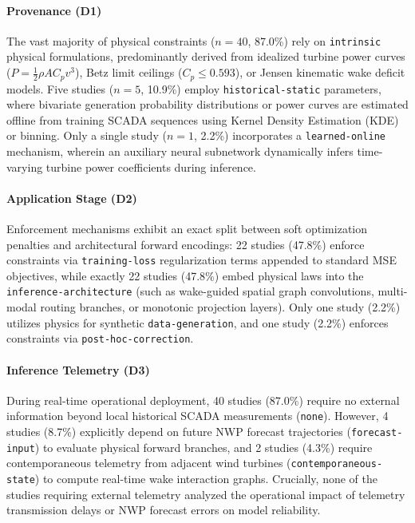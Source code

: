 \documentclass[preprint,3p,times]{elsarticle}
\begin{document}
\paragraph{Provenance (D1)} The vast majority of physical constraints ($n=40$, 87.0\%) rely on \texttt{intrinsic} physical formulations, predominantly derived from idealized turbine power curves ($P = \frac{1}{2} \rho A C_p v^3$), Betz limit ceilings ($C_p \le 0.593$), or Jensen kinematic wake deficit models. Five studies ($n=5$, 10.9\%) employ \texttt{historical-static} parameters, where bivariate generation probability distributions or power curves are estimated offline from training SCADA sequences using Kernel Density Estimation (KDE) or binning. Only a single study ($n=1$, 2.2\%) incorporates a \texttt{learned-online} mechanism, wherein an auxiliary neural subnetwork dynamically infers time-varying turbine power coefficients during inference.

\paragraph{Application Stage (D2)} Enforcement mechanisms exhibit an exact split between soft optimization penalties and architectural forward encodings: 22 studies (47.8\%) enforce constraints via \texttt{training-loss} regularization terms appended to standard MSE objectives, while exactly 22 studies (47.8\%) embed physical laws into the \texttt{inference-architecture} (such as wake-guided spatial graph convolutions, multi-modal routing branches, or monotonic projection layers). Only one study (2.2\%) utilizes physics for synthetic \texttt{data-generation}, and one study (2.2\%) enforces constraints via \texttt{post-hoc-correction}.

\paragraph{Inference Telemetry (D3)} During real-time operational deployment, 40 studies (87.0\%) require no external information beyond local historical SCADA measurements (\texttt{none}). However, 4 studies (8.7\%) explicitly depend on future NWP forecast trajectories (\texttt{forecast-input}) to evaluate physical forward branches, and 2 studies (4.3\%) require contemporaneous telemetry from adjacent wind turbines (\texttt{contemporaneous-state}) to compute real-time wake interaction graphs. Crucially, none of the studies requiring external telemetry analyzed the operational impact of telemetry transmission delays or NWP forecast errors on model reliability.
\end{document}
